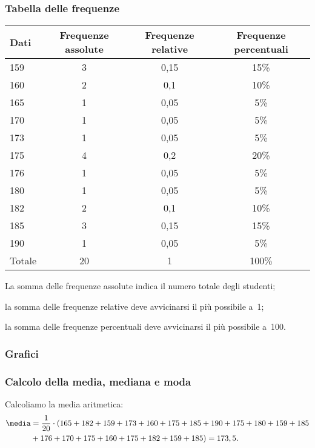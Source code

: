 \begin{exrig}
\begin{esempio}
\subsubsection{Tabella delle frequenze}
\begin{center}
\begin{tabular}{lccc}
\toprule
Dati & Frequenze assolute & Frequenze relative & Frequenze percentuali\\
\midrule
159 & 3 & 0,15 & 15\% \\
160 & 2 & 0,1 & 10\% \\
165 & 1 & 0,05 & 5\% \\
170 & 1 & 0,05 & 5\% \\
173 & 1 & 0,05 & 5\% \\
175 & 4 & 0,2 & 20\% \\
176 & 1 & 0,05 & 5\% \\
180 & 1 & 0,05 & 5\% \\
182 & 2 & 0,1 & 10\% \\
185 & 3 & 0,15 & 15\% \\
190 & 1 & 0,05 & 5\% \\
\midrule
Totale & 20 & 1 & 100\% \\
\bottomrule
\end{tabular}
\end{center}
\begin{itemize*}
\item La somma delle frequenze assolute indica il numero totale degli studenti;
\item la somma delle frequenze relative deve avvicinarsi il più possibile a~1;
\item la somma delle frequenze percentuali deve avvicinarsi il più possibile a~100.
\end{itemize*}

\subsubsection{Grafici}
\begin{center}
 
\end{center}

\subsubsection{Calcolo della media, mediana e moda}


Calcoliamo la media aritmetica:
\begin{equation*}
\begin{split}
\media &= \frac{1}{20} \cdot (165+182+159+173+160+175+185+190+175+180+159+185\\
 &+176+170+175+160+175+182+159+185)=173,5.
\end{split}
\end{equation*}



\end{esempio}
\end{exrig}
